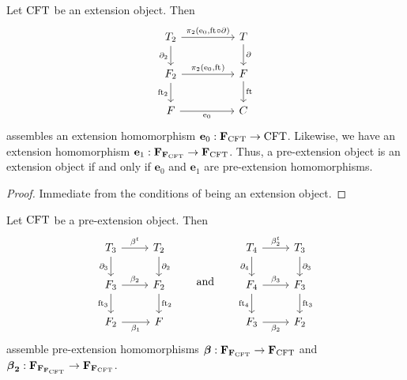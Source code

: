 \begin{lem}
Let $\mathrm{CFT}$ be an extension object. Then
\begin{equation*}
\begin{tikzcd}[column sep=huge]
\stesyst_2
  \ar{r}{\pullbackpr{2}{\ectxext}{\eft\circ\ebd}}
  \ar{d}[swap]{\ebd[2]}
  &
\stesyst
  \ar{d}{\ebd}
  \\
\stesysf_2
  \ar{r}{\pullbackpr{2}{\ectxext}{\eft}}
  \ar{d}[swap]{\eft[2]}
  &
\stesysf
  \ar{d}{\eft}
  \\
\stesysf
  \ar{r}[swap]{\ectxext}
  &
\stesysc
\end{tikzcd}
\end{equation*}
assembles an extension homomorphism $\mathbf{e}_0:\mathbf{F}_{\mathrm{CFT}}\to\mathrm{CFT}$.
Likewise, we have an extension homomorphism
$\mathbf{e}_1:\mathbf{F}_{\mathbf{F}_{\mathrm{CFT}}}\to\mathbf{F}_{\mathrm{CFT}}$. Thus, a
pre-extension object is an extension object if and only if $\mathbf{e}_0$
and $\mathbf{e}_1$ are pre-extension homomorphisms.
\end{lem}

\begin{proof}
Immediate from the conditions of being an extension object.
\end{proof}

\begin{defn}
Let $\mathrm{CFT}$ be a pre-extension object. Then
\begin{equation*}
\begin{tikzcd}
\stesyst_3
  \ar{r}{\beta^t}
  \ar{d}[swap]{\ebd[3]}
  &
\stesyst_2
  \ar{d}{\ebd[2]}
  \\
\stesysf_3
  \ar{r}{\beta_2}
  \ar{d}[swap]{\eft[3]}
  &
\stesysf_2
  \ar{d}{\eft[2]}
  \\
\stesysf_2
  \ar{r}[swap]{\beta_1}
  &
\stesysf
\end{tikzcd}
\qquad
\text{and}
\qquad
\begin{tikzcd}
\stesyst_4
  \ar{r}{\beta^t_2}
  \ar{d}[swap]{\ebd[4]}
  &
\stesyst_3
  \ar{d}{\ebd[3]}
  \\
\stesysf_4
  \ar{r}{\beta_3}
  \ar{d}[swap]{\eft[4]}
  &
\stesysf_3
  \ar{d}{\eft[3]}
  \\
\stesysf_3
  \ar{r}[swap]{\beta_2}
  &
\stesysf_2
\end{tikzcd}
\end{equation*}
assemble pre-extension homomorphisms 
\(
\boldsymbol{\beta}
  :
\mathbf{F}_{\mathbf{F}_{\mathrm{CFT}}}
  \to
\mathbf{F}_{\mathrm{CFT}}
\) 
and
\(
\boldsymbol{\beta}_\mathbf{2}
  :
\mathbf{F}_{\mathbf{F}_{\mathbf{F}_{\mathrm{CFT}}}}
  \to
\mathbf{F}_{\mathbf{F}_{\mathrm{CFT}}}
\).
\end{defn}

